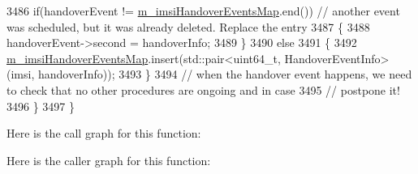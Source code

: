 \begin{DoxyCode}
3486     \textcolor{keywordflow}{if}(handoverEvent != \hyperlink{classns3_1_1LteEnbRrc_a6f703158e9a4ceaccbd1c5df7f5b0ba1}{m\_imsiHandoverEventsMap}.end()) \textcolor{comment}{// another event was
       scheduled, but it was already deleted. Replace the entry}
3487     \{
3488       handoverEvent->second = handoverInfo;
3489     \}
3490     \textcolor{keywordflow}{else}
3491     \{
3492       \hyperlink{classns3_1_1LteEnbRrc_a6f703158e9a4ceaccbd1c5df7f5b0ba1}{m\_imsiHandoverEventsMap}.insert(std::pair<uint64\_t, HandoverEventInfo> (imsi, 
      handoverInfo));
3493     \}
3494     \textcolor{comment}{// when the handover event happens, we need to check that no other procedures are ongoing and in case}
3495     \textcolor{comment}{// postpone it!}
3496   \}
3497 \}
\end{DoxyCode}


Here is the call graph for this function\+:




Here is the caller graph for this function\+:



